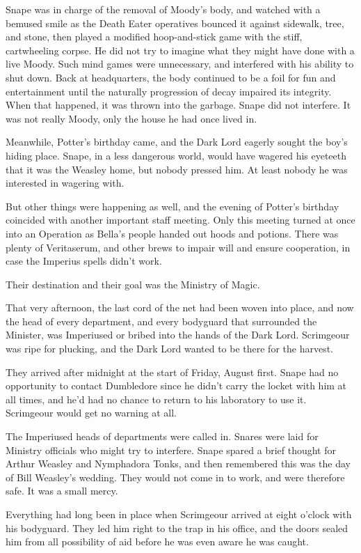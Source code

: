 Snape was in charge of the removal of Moody's body, and watched with a bemused smile as the Death Eater operatives bounced it against sidewalk, tree, and stone, then played a modified hoop-and-stick game with the stiff, cartwheeling corpse. He did not try to imagine what they might have done with a live Moody. Such mind games were unnecessary, and interfered with his ability to shut down. Back at headquarters, the body continued to be a foil for fun and entertainment until the naturally progression of decay impaired its integrity. When that happened, it was thrown into the garbage. Snape did not interfere. It was not really Moody, only the house he had once lived in.

Meanwhile, Potter's birthday came, and the Dark Lord eagerly sought the boy's hiding place. Snape, in a less dangerous world, would have wagered his eyeteeth that it was the Weasley home, but nobody pressed him. At least nobody he was interested in wagering with.

But other things were happening as well, and the evening of Potter's birthday coincided with another important staff meeting. Only this meeting turned at once into an Operation as Bella's people handed out hoods and potions. There was plenty of Veritaserum, and other brews to impair will and ensure cooperation, in case the Imperius spells didn't work.

Their destination and their goal was the Ministry of Magic.

That very afternoon, the last cord of the net had been woven into place, and now the head of every department, and every bodyguard that surrounded the Minister, was Imperiused or bribed into the hands of the Dark Lord. Scrimgeour was ripe for plucking, and the Dark Lord wanted to be there for the harvest.

They arrived after midnight at the start of Friday, August first. Snape had no opportunity to contact Dumbledore since he didn't carry the locket with him at all times, and he'd had no chance to return to his laboratory to use it. Scrimgeour would get no warning at all.

The Imperiused heads of departments were called in. Snares were laid for Ministry officials who might try to interfere. Snape spared a brief thought for Arthur Weasley and Nymphadora Tonks, and then remembered this was the day of Bill Weasley's wedding. They would not come in to work, and were therefore safe. It was a small mercy.

Everything had long been in place when Scrimgeour arrived at eight o'clock with his bodyguard. They led him right to the trap in his office, and the doors sealed him from all possibility of aid before he was even aware he was caught.

